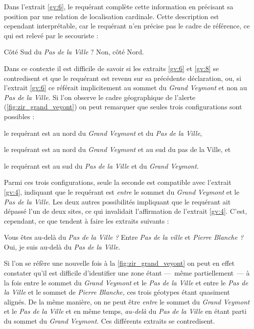 Dans l'extrait \ref{gv:6}, le requérant complète cette information en
précisant sa position par une relation de localisation
cardinale. Cette description est cependant interprétable, car le
requérant n'en précise pas le cadre de référence, ce qui est relevé
par le secouriste :
%
\begin{dialogue*}
  \Sec {} Côté Sud du \emph{Pas de la Ville} ?
%
  \Req {} Non, côté Nord.
\end{dialogue*}
%
Dans ce contexte il est difficile de savoir si les extraits \ref{gv:6}
et \ref{gv:8} se contredisent et que le requérant est revenu sur sa
précédente déclaration, ou, si l'extrait \ref{gv:6} ce référait
implicitement au sommet du \emph{Grand Veymont} et non au \emph{Pas de
  la Ville.} Si l'on observe le cadre géographique de l'alerte
(\autoref{fig:zir_grand_veyont}) on peut remarquer que seules trois
configurations sont possibles :
%
\begin{enumerate*}[label=(\arabic*)]
\item le requérant est au nord du \emph{Grand Veymont} et du \emph{Pas
    de la Ville},
\item le requérant est au nord du \emph{Grand Veymont} et au sud du
  pas de la Ville, et
\item le requérant est au sud du \emph{Pas de la Ville} et du
  \emph{Grand Veymont.}
\end{enumerate*}
%
Parmi ces trois configurations, seule la seconde est compatible avec
l'extrait \ref{gv:4}, indiquant que le requérant est \emph{entre} le
sommet du \emph{Grand Veymont} et le \emph{Pas de la Ville.} Les deux
autres possibilités impliquant que le requérant ait dépassé l'un de
deux sites, ce qui invalidait l'affirmation de l'extrait
\ref{gv:4}. C'est, cependant, ce que tendent à faire les extraits
suivants :
%
\begin{dialogue*}
  \Sec {} Vous êtes au-delà du \emph{Pas de la Ville ?}
   Entre \emph{Pas de la ville} et \emph{Pierre
    Blanche ?}
  \Req {} Oui, je suis au-delà du \emph{Pas de la
    Ville.}
\end{dialogue*}
%
Si l'on se réfère une nouvelle fois à la
\autoref{fig:zir_grand_veyont} on peut en effet constater qu'il est
difficile d'identifier une zone étant ---~même partiellement~--- à la
fois entre le sommet du \emph{Grand Veymont} et le \emph{Pas de la
  Ville} et entre le \emph{Pas de la Ville} et le sommet de
\emph{Pierre Blanche,} ces trois géotypes étant quasiment alignés. De
la même manière, on ne peut être \emph{entre} le sommet du \emph{Grand
  Veymont} et le \emph{Pas de la Ville} et en même temps,
\emph{au-delà} du \emph{Pas de la Ville} en étant parti du sommet du
\emph{Grand Veymont.} Ces différents extraits se contredisent.

